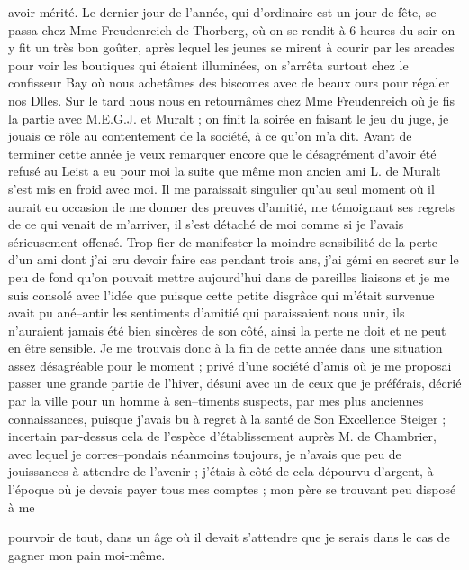 \documentclass[12pt]{article}
\begin{document}
 avoir mérité. Le dernier jour de l’année, qui
d’ordinaire est un jour de fête, se passa chez Mme Freudenreich de Thorberg, où on se rendit à 6
heures du soir on y fit un très bon goûter, après lequel les jeunes se mirent à courir par les
arcades pour voir les boutiques qui étaient illuminées, on s’arrêta surtout chez le confisseur Bay
où nous achetâmes des biscomes avec de beaux ours pour régaler nos Dlles. Sur le tard nous nous en
retournâmes chez Mme Freudenreich où je fis la partie avec M.E.G.J. et Muralt ; on finit la soirée
en faisant le jeu du juge, je jouais ce rôle au contentement de la société, à ce qu’on m’a dit.
Avant de terminer cette année je veux remarquer encore que le désagrément d’avoir été refusé au
Leist a eu pour moi la suite que même mon ancien ami L. de Muralt s’est mis en froid avec moi. Il me
paraissait singulier qu’au seul moment où il aurait eu occasion de me donner des preuves d’amitié,
me témoignant ses regrets de ce qui venait de m’arriver, il s’est détaché de moi comme si je l’avais
sérieusement offensé. Trop fier de manifester la moindre sensibilité de la perte d’un ami dont j’ai
cru devoir faire cas pendant trois ans, j’ai gémi en secret sur le peu de fond qu’on pouvait mettre
aujourd’hui dans de pareilles liaisons et je me suis consolé avec l’idée que puisque cette petite
disgrâce qui m’était survenue avait pu ané–antir les sentiments d’amitié qui paraissaient nous unir,
ils n’auraient jamais été bien sincères de son côté, ainsi la perte ne doit et ne peut en être
sensible. Je me trouvais donc à la fin de cette année dans une situation assez désagréable pour le
moment ; privé d’une société d’amis où je me proposai passer une grande partie de l’hiver, désuni
avec un de ceux que je préférais, décrié par la ville pour un homme à sen–timents suspects, par mes
plus anciennes connaissances, puisque j’avais bu à regret à la santé de Son Excellence Steiger ;
incertain par-dessus cela de l’espèce d’établissement auprès M. de Chambrier, avec lequel je
corres–pondais néanmoins toujours, je n’avais que peu de jouissances à attendre de l’avenir ;
j’étais à côté de cela dépourvu d’argent, à l’époque où je devais payer tous mes comptes ; mon père
se trouvant peu disposé à me

 pourvoir de tout, dans un âge où il devait
s’attendre que je serais dans le cas de gagner mon pain moi-même.
\end{document}
